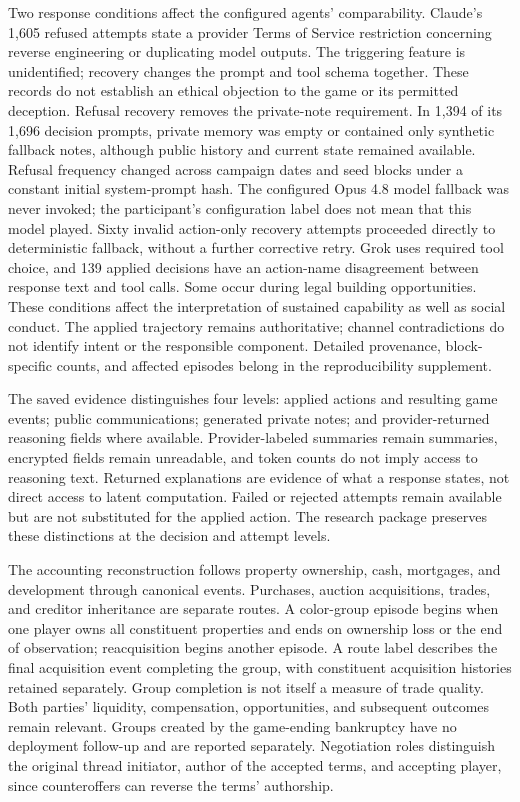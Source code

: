 Two response conditions affect the configured agents' comparability. Claude's
1,605 refused attempts state a provider Terms of Service restriction concerning
reverse engineering or duplicating model outputs. The triggering feature is
unidentified; recovery changes the prompt and tool schema together. These records
do not establish an ethical objection to the game or its permitted deception.
Refusal recovery removes the private-note requirement. In 1,394 of its 1,696
decision prompts, private memory was empty or contained only synthetic fallback
notes, although public history and current state remained available. Refusal
frequency changed across campaign dates and seed blocks under a constant initial
system-prompt hash. The configured Opus 4.8 model fallback was never invoked;
the participant's configuration label does not mean that this model played.
Sixty invalid action-only recovery
attempts proceeded directly to deterministic fallback, without a further
corrective retry. Grok uses required tool choice, and 139 applied decisions have
an action-name disagreement between response text and tool calls. Some occur
during legal building opportunities. These conditions affect the interpretation
of sustained capability as well as social conduct. The applied trajectory remains
authoritative; channel contradictions do not identify intent or the responsible
component. Detailed provenance, block-specific counts, and affected episodes
belong in the reproducibility supplement.

The saved evidence distinguishes four levels: applied actions and resulting game
events; public communications; generated private notes; and provider-returned
reasoning fields where available. Provider-labeled summaries remain summaries,
encrypted fields remain unreadable, and token counts do not imply access to
reasoning text. Returned explanations are evidence of what a response states,
not direct access to latent computation. Failed or rejected attempts remain
available but are not substituted for the applied action. The research package
preserves these distinctions at the decision and attempt levels.

The accounting reconstruction follows property ownership, cash, mortgages, and
development through canonical events. Purchases, auction acquisitions, trades,
and creditor inheritance are separate routes. A color-group episode begins
when one player owns all constituent properties and ends on ownership loss or
the end of observation; reacquisition begins another episode. A route label
describes the final acquisition event completing the group, with constituent
acquisition histories retained separately. Group completion is not itself a
measure of trade quality. Both parties' liquidity, compensation, opportunities,
and subsequent outcomes remain relevant. Groups created by the game-ending
bankruptcy have no deployment follow-up and are reported separately. Negotiation
roles distinguish the original thread initiator, author of the accepted terms,
and accepting player, since counteroffers can reverse the terms' authorship.


